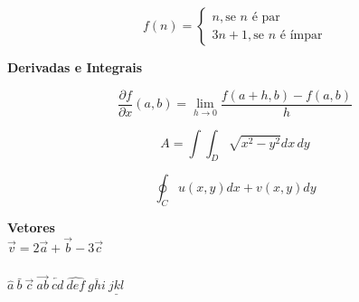 \documentclass[12pt,a4paper,oneside,titlepage]{report}
\begin{document}
\begin{equation}
f(n) =
\left\{ 
\begin{array} {ll}
n, \mbox{se }n\mbox{ é par}  \\ 
3n+1, \mbox{se }n\mbox{ é ímpar} 
\end{array} 
\right.
\end{equation}

\textbf{Derivadas e Integrais}

\[ 
\frac{\partial f}{\partial x}(a,b) = \lim_{h \to 0} \frac{f(a+h,b)-
f(a,b)}{h} 
\]

\[ A= \int \! \! \! \int_D \sqrt{x^2-y^2} dx \, dy \]

\[ \oint_C u(x,y) dx + v(x,y)dy \]

\textbf{Vetores}
\\

$ \vec v=2 \vec a + \vec b - 3 \vec c $
\\
\\
$\hat a \ \bar b \ \vec c \ \overrightarrow{a b} \ \overleftarrow{c d} \ \widehat{d e f} \ \overline{g h i} \ \underline{j k l}$
\end{document}
